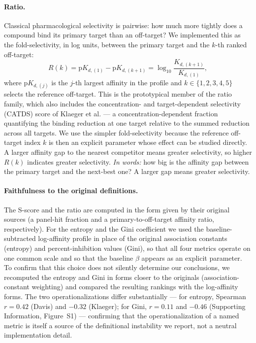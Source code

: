 \documentclass[journal=jcisd8,manuscript=article]{achemso}
\begin{document}
\paragraph{Ratio.}
Classical pharmacological selectivity is pairwise: how much more tightly does a
compound bind its primary target than an off-target?
We implemented this as the fold-selectivity, in log units, between the primary
target and the $k$-th ranked off-target:
\begin{equation}
  R(k) = \mathrm{p}K_{d,(1)} - \mathrm{p}K_{d,(k+1)}
       = \log_{10}\!\frac{K_{d,(k+1)}}{K_{d,(1)}},
\end{equation}
where $\mathrm{p}K_{d,(j)}$ is the $j$-th largest affinity in the profile and
$k \in \{1, 2, 3, 4, 5\}$ selects the reference off-target.
This is the prototypical member of the ratio family, which also includes the
concentration- and target-dependent selectivity (CATDS) score of Klaeger et
al.\cite{Klaeger2017} --- a concentration-dependent fraction quantifying the
binding reduction at one target relative to the summed reduction across all
targets.
We use the simpler fold-selectivity because the reference off-target index $k$
is then an explicit parameter whose effect can be studied directly.
A larger affinity gap to the nearest competitor means greater selectivity, so
higher $R(k)$ indicates greater selectivity.
\emph{In words:} how big is the affinity gap between the primary target and the
next-best one? A larger gap means greater selectivity.

\paragraph{Faithfulness to the original definitions.}
The S-score and the ratio are computed in the form given by their original
sources (a panel-hit fraction and a primary-to-off-target affinity ratio,
respectively).
For the entropy and the Gini coefficient we used the baseline-subtracted
log-affinity profile in place of the original association constants (entropy)
and percent-inhibition values (Gini), so that all four metrics operate on one
common scale and so that the baseline $\beta$ appears as an explicit parameter.
To confirm that this choice does not silently determine our conclusions, we
recomputed the entropy and Gini in forms closer to the originals
(association-constant weighting) and compared the resulting rankings with the
log-affinity forms.
The two operationalizations differ substantially --- for entropy, Spearman
$r = 0.42$ (Davis) and $-0.32$ (Klaeger); for Gini, $r = 0.11$ and $-0.46$
(Supporting Information, Figure~S1) --- confirming that the operationalization
of a named metric is itself a source of the definitional instability we report,
not a neutral implementation detail.
\end{document}

